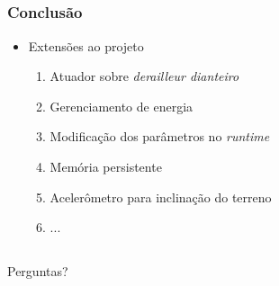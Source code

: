 \documentclass{beamer}
\begin{document}
\subsection{}
\begin{frame}
  \frametitle{Conclusão}
\begin{itemize}
 \item Extensões ao projeto
  \begin{enumerate}
   \item Atuador sobre \textit{derailleur dianteiro}
    \item Gerenciamento de energia
    \item Modificação dos parâmetros no \textit{runtime}
    \item Memória persistente
    \item Acelerômetro para inclinação do terreno
    \item ...
  \end{enumerate}

\end{itemize}

\end{frame}



\subsection{}
\begin{frame}

\vfil
\begin{center}
 \Large Perguntas?
\end{center}


\end{frame}
\end{document}
